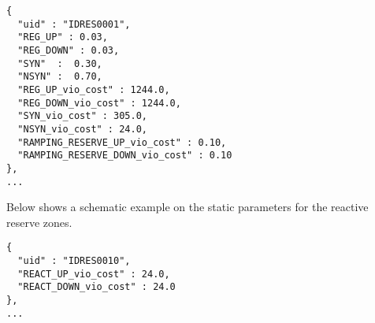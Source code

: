 \begin{verbatim}
{
  "uid" : "IDRES0001",
  "REG_UP" : 0.03,
  "REG_DOWN" : 0.03,
  "SYN"  :  0.30,
  "NSYN" :  0.70,
  "REG_UP_vio_cost" : 1244.0,
  "REG_DOWN_vio_cost" : 1244.0,
  "SYN_vio_cost" : 305.0,
  "NSYN_vio_cost" : 24.0,  
  "RAMPING_RESERVE_UP_vio_cost" : 0.10,  
  "RAMPING_RESERVE_DOWN_vio_cost" : 0.10
},
...
\end{verbatim}

Below shows a schematic example on the static parameters for the reactive reserve zones. 
\begin{verbatim}
{
  "uid" : "IDRES0010",
  "REACT_UP_vio_cost" : 24.0,
  "REACT_DOWN_vio_cost" : 24.0
},
...
\end{verbatim}





